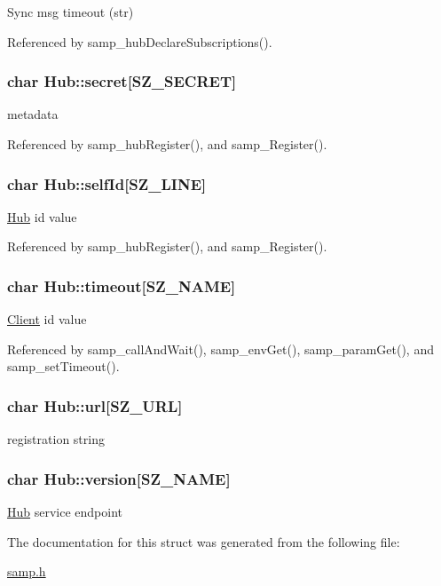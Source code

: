 Sync msg timeout (str) 

Referenced by samp\_\-hubDeclareSubscriptions().\hypertarget{structHub_00e09b2ce458d0e43d91e33164025974}{
\subsubsection[{secret}]{\setlength{\rightskip}{0pt plus 5cm}char {\bf Hub::secret}\mbox{[}SZ\_\-SECRET\mbox{]}}}
\label{structHub_00e09b2ce458d0e43d91e33164025974}


metadata 

Referenced by samp\_\-hubRegister(), and samp\_\-Register().\hypertarget{structHub_bddf272976fef652a3726c53043c2422}{
\subsubsection[{selfId}]{\setlength{\rightskip}{0pt plus 5cm}char {\bf Hub::selfId}\mbox{[}SZ\_\-LINE\mbox{]}}}
\label{structHub_bddf272976fef652a3726c53043c2422}


\hyperlink{structHub}{Hub} id value 

Referenced by samp\_\-hubRegister(), and samp\_\-Register().\hypertarget{structHub_0489ccea4de8979acba98cfe73662a5a}{
\subsubsection[{timeout}]{\setlength{\rightskip}{0pt plus 5cm}char {\bf Hub::timeout}\mbox{[}SZ\_\-NAME\mbox{]}}}
\label{structHub_0489ccea4de8979acba98cfe73662a5a}


\hyperlink{structClient}{Client} id value 

Referenced by samp\_\-callAndWait(), samp\_\-envGet(), samp\_\-paramGet(), and samp\_\-setTimeout().\hypertarget{structHub_809a3f03e2e80609de4ad7ecd8b3ce19}{
\subsubsection[{url}]{\setlength{\rightskip}{0pt plus 5cm}char {\bf Hub::url}\mbox{[}SZ\_\-URL\mbox{]}}}
\label{structHub_809a3f03e2e80609de4ad7ecd8b3ce19}


registration string \hypertarget{structHub_6781579d63b6e392837fecc18b481e02}{
\subsubsection[{version}]{\setlength{\rightskip}{0pt plus 5cm}char {\bf Hub::version}\mbox{[}SZ\_\-NAME\mbox{]}}}
\label{structHub_6781579d63b6e392837fecc18b481e02}


\hyperlink{structHub}{Hub} service endpoint 

The documentation for this struct was generated from the following file:\begin{CompactItemize}
\item 
\hyperlink{samp_8h}{samp.h}\end{CompactItemize}
